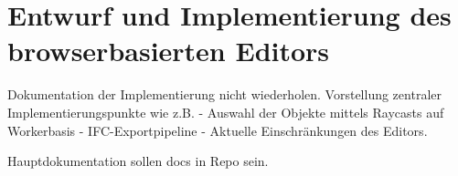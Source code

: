 \section{Entwurf und Implementierung des browserbasierten Editors}\label{sec:Editor}

Dokumentation der Implementierung nicht wiederholen. Vorstellung zentraler Implementierungspunkte wie z.B.  \newline
- Auswahl der Objekte mittels Raycasts auf Workerbasis \newline
- IFC-Exportpipeline \newline
- Aktuelle Einschränkungen des Editors. \newline

Hauptdokumentation sollen docs in Repo sein. \newline